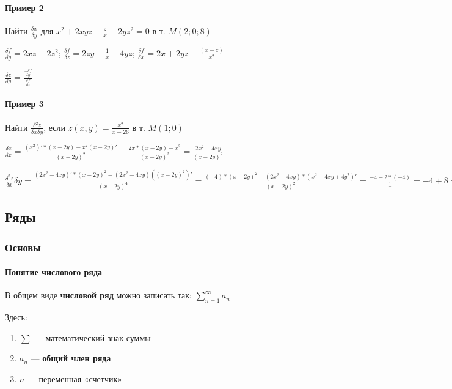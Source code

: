 \documentclass{article}
\begin{document}
\paragraph{Пример 2}

\hfill

\hfill

Найти $\frac{\delta x}{\delta y}$ для $x^2 + 2xyz - \frac{z}{x} - 2yz^2 = 0$ в т. $M(2; 0; 8)$

$\frac{\delta f}{\delta y} = 2xz - 2z^2$; $\frac{\delta f}{\delta z} = 2zy - \frac{1}{x} - 4yz$; $\frac{\delta f}{\delta x} = 2x + 2yz - \frac{(x - z)}{x^2}$

$\frac{\delta z}{\delta y} = \frac{\frac{- \delta f}{\delta y}}{\frac{\delta f}{\delta z}}$


\paragraph{Пример 3}

\hfill

\hfill

Найти $\frac{\delta^2 z}{\delta x \delta y}$, если $z(x, y) = \frac{x^2}{x - 26}$ в т. $M(1; 0)$

$\frac{\delta z}{\delta x} = \frac{(x^2)' * (x - 2y) - x^2(x - 2y)'}{(x - 2y)^2} - \frac{2x * (x - 2y) - x^2}{(x - 2y)^2} = \frac{2x^2 - 4x y}{(x - 2y)^2}$

$\frac{\delta^2 z}{\delta x}{\delta y} = \frac{(2x^2 - 4xy)' * (x - 2y)^2 - (2x^2 - 4xy)((x - 2y)^2)'}{(x - 2y)^4} = \frac{(-4) * (x - 2y)^2 - (2x^2 - 4xy) * (x^2 - 4x y + 4y^2)'}{(x - 2y)^2} = \frac{-4 - 2 * (-4)}{1} = -4 + 8 = 4$

\pagebreak
\subsection{Ряды}

\subsubsection{Основы}

\paragraph{Понятие числового ряда}

В общем виде \textbf{числовой ряд} можно записать так: $\sum\limits_{n = 1}^{\infty} a_{n}$

Здесь:

\begin{enumerate}
    \item $\sum$ — математический знак суммы
    \item $a_{n}$ — \textbf{общий член ряда}
    \item $n$ — переменная-«счетчик»
\end{enumerate}
\end{document}
